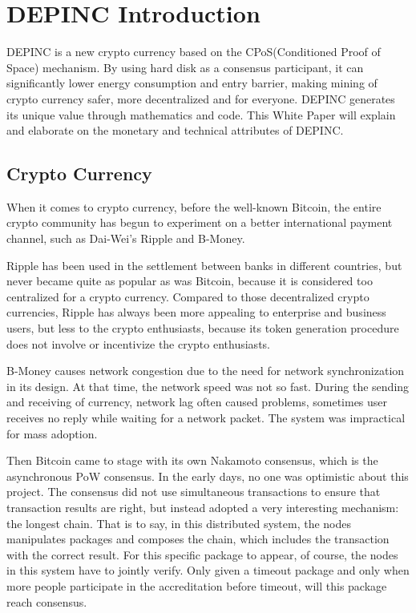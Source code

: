 \chapter{DEPINC Introduction}
DEPINC is a new crypto currency based on the CPoS(Conditioned Proof of Space) mechanism. By using hard disk as a consensus participant, it can significantly lower energy consumption and entry barrier, making mining of crypto currency safer, more decentralized and for everyone. DEPINC generates its unique value through mathematics and code. This White Paper will explain and elaborate on the monetary and technical attributes of DEPINC.
\section{Crypto Currency}
\begin{flushleft}
    When it comes to crypto currency, before the well-known Bitcoin, the entire crypto community has begun to experiment on a better international payment channel, such as Dai-Wei's Ripple and B-Money.
\end{flushleft}
\begin{flushleft}
    Ripple has been used in the settlement between banks in different countries, but never became quite as popular as was Bitcoin, because it is considered too centralized for a crypto currency. Compared to those decentralized crypto currencies, Ripple has always been more appealing to enterprise and business users, but less to the crypto enthusiasts, because its token generation procedure does not involve or incentivize the crypto enthusiasts.
\end{flushleft}
\begin{flushleft}
    B-Money causes network congestion due to the need for network synchronization in its design. At that time, the network speed was not so fast. During the sending and receiving of currency, network lag often caused problems, sometimes user receives no reply while waiting for a network packet. The system was impractical for mass adoption.
\end{flushleft}
\begin{flushleft}
    Then Bitcoin came to stage with its own Nakamoto consensus, which is the asynchronous PoW consensus. In the early days, no one was optimistic about this project. The consensus did not use simultaneous transactions to ensure that transaction results are right, but instead adopted a very interesting mechanism: the longest chain. That is to say, in this distributed system, the nodes manipulates packages and composes the chain, which includes the transaction with the correct result. For this specific package to appear, of course, the nodes in this system have to jointly verify. Only given a timeout package and only when more people participate in the accreditation before timeout, will this package reach consensus.
\end{flushleft}
